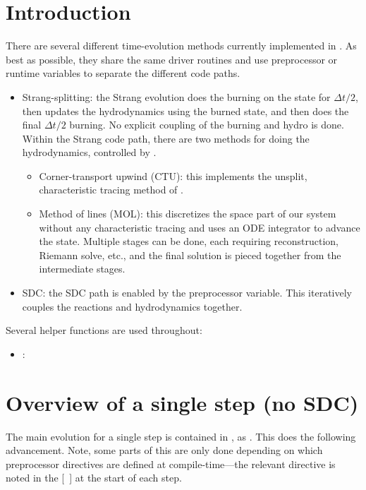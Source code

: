 
\section{Introduction}

There are several different time-evolution methods currently
implemented in \castro.  As best as possible, they share the same
driver routines and use preprocessor or runtime variables to separate
the different code paths.

\begin{itemize}
\item Strang-splitting: the Strang evolution does the burning on the
  state for $\Delta t/2$, then updates the hydrodynamics using the
  burned state, and then does the final $\Delta t/2$ burning.  No
  explicit coupling of the burning and hydro is done.  Within the
  Strang code path, there are two methods for doing the hydrodynamics,
  controlled by .
  \begin{itemize}
    \item Corner-transport upwind (CTU): this implements the unsplit, 
      characteristic tracing method of \cite{colella:1990}.

    \item Method of lines (MOL): this discretizes the space part of 
      our system without any characteristic tracing and uses an
      ODE integrator to advance the state.  Multiple stages can be done,
      each requiring reconstruction, Riemann solve, etc., and the final
      solution is pieced together from the intermediate stages.
  \end{itemize}

\item SDC: the SDC path is enabled by the  preprocessor
  variable.  This iteratively couples the reactions and hydrodynamics together.

\end{itemize}

Several helper functions are used throughout:
\begin{itemize}
  \item {}:
\end{itemize}

\section{Overview of a single step (no SDC)}
\label{flow:sec:nosdc}

The main evolution for a single step is contained in
, as .  This does
the following advancement.  Note, some parts of this are only done
depending on which preprocessor directives are defined at
compile-time---the relevant directive is noted in the [\ ] at the start
of each step.

